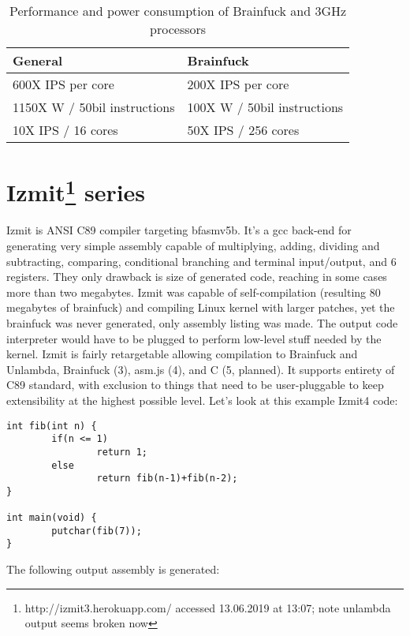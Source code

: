 \documentclass{article}
\begin{document}
\begin{table}[h]
\centering
\caption{Performance and power consumption of Brainfuck and 3GHz processors}
\label{tab:instropcom}
\begin{tabular}{|l|l|}
\hline
\textbf{General} & \textbf{Brainfuck} \\ \hline
600X IPS per core & 200X IPS per core \\ \hline
1150X W / 50bil instructions & 100X W / 50bil instructions \\ \hline
10X IPS / 16 cores & 50X IPS / 256 cores \\ \hline
\end{tabular}
\end{table}

\section{Izmit\footnote{http://izmit3.herokuapp.com/ accessed 13.06.2019 at 13:07; note unlambda output seems broken now} series}
\par Izmit is ANSI C89 compiler targeting bfasmv5b. It's a gcc back-end for generating very simple assembly capable of multiplying, adding, dividing and subtracting, comparing, conditional branching and terminal input/output, and 6 registers. They only drawback is size of generated code, reaching in some cases more than two megabytes. Izmit was capable of self-compilation (resulting 80 megabytes of brainfuck) and compiling Linux kernel with larger patches, yet the brainfuck was never generated, only assembly listing was made. The output code interpreter would have to be plugged to perform low-level stuff needed by the kernel. Izmit is fairly retargetable allowing compilation to Brainfuck and Unlambda, Brainfuck (3), asm.js (4), and C (5, planned). It supports entirety of C89 standard, with exclusion to things that need to be user-pluggable to keep extensibility at the highest possible level. Let's look at this example Izmit4 code:

\begin{verbatim}
int fib(int n) {
        if(n <= 1)
                return 1;
        else
                return fib(n-1)+fib(n-2);
}

int main(void) {
        putchar(fib(7));
}
\end{verbatim}

The following output assembly is generated:
\end{document}
